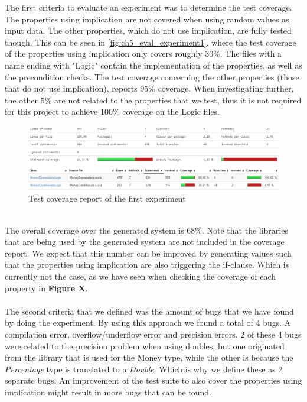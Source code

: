 The first criteria to evaluate an experiment was to determine the test coverage. The properties using implication are not covered when using random values as input data. The other properties, which do not use implication, are fully tested though. This can be seen in \autoref{fig:ch5_eval_experiment1}, where the test coverage of the properties using implication only covers roughly 30\%. The files with a name ending with "Logic" contain the implementation of the properties, as well as the precondition checks. The test coverage concerning the other properties (those that do not use implication), reports 95\% coverage. When investigating further, the other 5\% are not related to the properties that we test, thus it is not required for this project to achieve 100\% coverage on the Logic files.\\
\begin{figure}[h!]
	\includegraphics[width=\linewidth]{figures/eval_experiment1}
\caption{Test coverage report of the first experiment}
\label{fig:ch5_eval_experiment1}
\centering
\end{figure}
\\
The overall coverage over the generated system is 68\%. Note that the libraries that are being used by the generated system are not included in the coverage report. We expect that this number can be improved by generating values such that the properties using implication are also triggering the if-clause. Which is currently not the case, as we have seen when checking the coverage of each property in \textbf{Figure X}.\\
\\
The second criteria that we defined was the amount of bugs that we have found by doing the experiment. By using this approach we found a total of 4 bugs. A compilation error, overflow/underflow error and precision errors. 2 of these 4 bugs were related to the precision problem when using doubles, but one originated from the library that is used for the Money type, while the other is because the \textit{Percentage} type is translated to a \textit{Double}. Which is why we define these as 2 separate bugs. An improvement of the test suite to also cover the properties using implication might result in more bugs that can be found.

